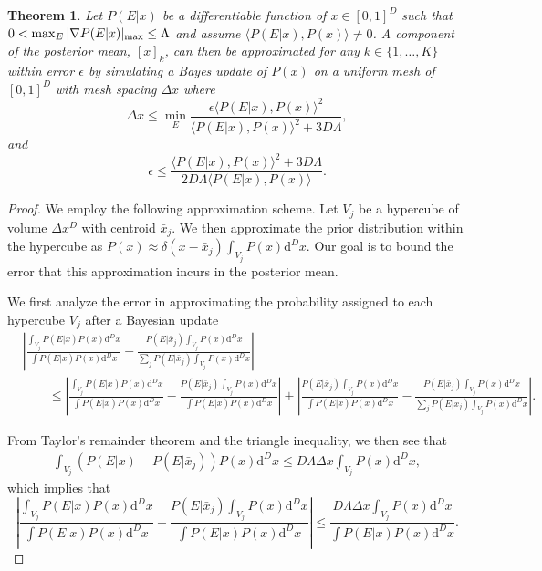 \documentclass[aps,amsmath,onecolumn,amssymb,notitlepage]{revtex4-1}
\newtheorem{theorem}{Theorem}
\begin{document}
\begin{theorem}
Let $P(E|x)$ be a differentiable function of $x\in [0,1]^D$ such that $0< \max_E|\nabla P(E|x) |_{\rm max} \le \Lambda$ and assume $\langle P(E|x), P(x)\rangle \ne 0$.   A component of the posterior mean, $[x]_k$, can then  be approximated for any $k\in \{1,\ldots, K\}$ within error $\epsilon$ by simulating a Bayes update of $P(x)$ on a uniform mesh of $[0,1]^D$ with mesh spacing $\Delta x$ where 
$$\Delta x \le \min_E \frac{\epsilon \langle P(E|x),P(x)\rangle^2}{\langle P(E|x),P(x)\rangle^2+3{D} \Lambda},$$
and
$$\epsilon \le \frac{\langle P(E|x),P(x)\rangle^2+ 3D\Lambda}{2 D\Lambda\langle P(E|x),P(x)\rangle}.$$
\label{thm:errbd}
\end{theorem}
\begin{proof}
We employ the following approximation scheme.  Let $V_j$ be a hypercube of volume $\Delta x^D$ with centroid $\bar{x}_j$.  We then approximate the prior distribution within the hypercube as $P(x) \approx  \delta (x-\bar{x}_j)\int_{V_j} P(x) \mathrm{d}^D x$.  Our goal is to bound the error that this approximation incurs in the posterior mean.

We first analyze the error in approximating the probability assigned to each hypercube $V_j$ after a Bayesian update
\begin{align}
&\left|\frac{\int_{V_j}P(E|x) P(x) \mathrm{d}^D x}{\int P(E|x) P(x) \mathrm{d}^D x} - \frac{P(E|\bar{x}_j)\int_{V_j} P(x) \mathrm{d}^D x}{\sum_jP(E|\bar{x}_j)\int_{V_j} P(x) \mathrm{d}^D x} \right|\nonumber\\
&\qquad\le \left|\frac{\int_{V_j}P(E|x) P(x) \mathrm{d}^D x}{\int P(E|x) P(x) \mathrm{d}^D x} - \frac{P(E|\bar{x}_j)\int_{V_j} P(x) \mathrm{d}^D x}{\int P(E|x) P(x) \mathrm{d}^D x} \right|+\left|\frac{P(E|\bar{x}_j)\int_{V_j} P(x) \mathrm{d}^D x}{\int P(E|x) P(x) \mathrm{d}^D x} - \frac{P(E|\bar{x}_j)\int_{V_j} P(x) \mathrm{d}^D x}{\sum_jP(E|\bar{x}_j)\int_{V_j} P(x) \mathrm{d}^D x} \right|.\label{eq:triangleeq}
\end{align}

From Taylor's remainder theorem and the triangle inequality, we then see that
\begin{align}
\int_{V_j} (P(E|x)-P(E|\bar{x}_j))P(x) \mathrm{d}^Dx\le D\Lambda \Delta x \int_{V_j} P(x)\mathrm{d}^Dx,
\end{align}
which implies that
\begin{equation}
 \left|\frac{\int_{V_j}P(E|x) P(x) \mathrm{d}^D x}{\int P(E|x) P(x) \mathrm{d}^D x} - \frac{P(E|\bar{x}_j)\int_{V_j} P(x) \mathrm{d}^D x}{\int P(E|x) P(x) \mathrm{d}^D x} \right| \le \frac{D\Lambda \Delta x\int_{V_j} P(x)\mathrm{d}^Dx}{\int P(E|x) P(x) \mathrm{d}^D x}.\label{eq:term1}
\end{equation}


\end{proof}
\end{document}

